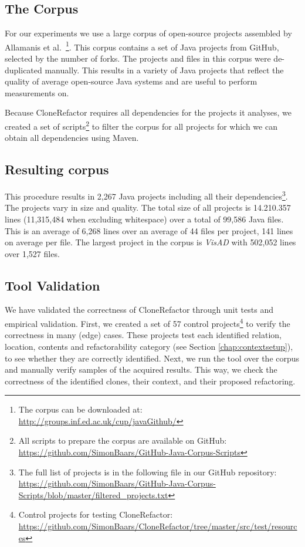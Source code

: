\documentclass[runningheads]{llncs}
\begin{document}
\subsection{The Corpus}\label{chap:corpus}
For our experiments we use a large corpus of open-source projects assembled by Allamanis et al.~\cite{githubCorpus2013}\footnote{The corpus can be downloaded at: \url{http://groups.inf.ed.ac.uk/cup/javaGithub/}}. This corpus contains a set of Java projects from GitHub, selected by the number of forks. The projects and files in this corpus were de-duplicated manually. This results in a variety of Java projects that reflect the quality of average open-source Java systems and are useful to perform measurements on.

Because CloneRefactor requires all dependencies for the projects it analyses, we created a set of scripts\footnote{All scripts to prepare the corpus are available on GitHub: \url{https://github.com/SimonBaars/GitHub-Java-Corpus-Scripts}} to filter the corpus for all projects for which we can obtain all dependencies using Maven.

\subsection{Resulting corpus}
This procedure results in 2,267 Java projects including all their dependencies\footnote{The full list of projects is in the following file in our GitHub repository: \url{https://github.com/SimonBaars/GitHub-Java-Corpus-Scripts/blob/master/filtered_projects.txt}}. The projects vary in size and quality. The total size of all projects is 14.210.357 lines (11,315,484 when excluding whitespace) over a total of 99,586 Java files. This is an average of 6,268 lines over an average of 44 files per project, 141 lines on average per file. The largest project in the corpus is \textit{VisAD} with 502,052 lines over 1,527 files.

\subsection{Tool Validation}
We have validated the correctness of CloneRefactor through unit tests and empirical validation. First, we created a set of 57 control projects\footnote{Control projects for testing CloneRefactor: \url{https://github.com/SimonBaars/CloneRefactor/tree/master/src/test/resources}} to verify the correctness in many (edge) cases. These projects test each identified relation, location, contents and refactorability category (see Section \ref{chap:contextsetup}), to see whether they are correctly identified. Next, we run the tool over the corpus and manually verify samples of the acquired results. This way, we check the correctness of the identified clones, their context, and their proposed refactoring.
\end{document}
